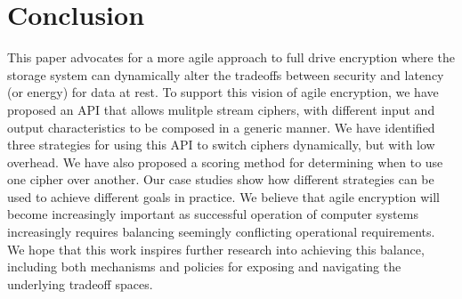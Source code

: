 \section{Conclusion}\label{sec:conclusion}
This paper advocates for a more agile approach to full 
drive encryption where the storage system can dynamically 
alter the tradeoffs between security and latency (or energy) 
for data at rest.  To support this vision of agile encryption,
we have proposed an API that allows mulitple stream ciphers, with 
different input and output characteristics to be composed in a 
generic manner.  We have identified three strategies for using 
this API to switch ciphers dynamically, but with low overhead.  
We have also proposed a scoring method for determining when to 
use one cipher over another. Our case studies show how different 
strategies can be used to achieve different goals in practice.
We believe that agile encryption will become increasingly important 
as successful operation of computer systems increasingly requires 
balancing seemingly conflicting operational requirements.  We hope 
that this work inspires further research into achieving this balance, 
including both mechanisms and policies for exposing and navigating 
the underlying tradeoff spaces.



